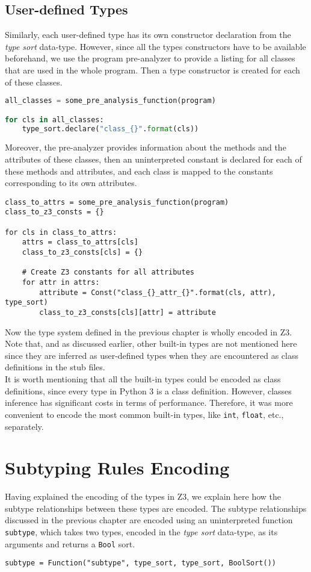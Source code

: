 \subsection{User-defined Types}
Similarly, each user-defined type has its own constructor declaration from the \textit{type sort} data-type. However, since all the types constructors have to be available beforehand, we use the program pre-analyzer to provide a listing for all classes that are used in the whole program. Then a type constructor is created for each of these classes. 

\begin{lstlisting}[language=python]
all_classes = some_pre_analysis_function(program)

for cls in all_classes:
	type_sort.declare("class_{}".format(cls))
\end{lstlisting}

Moreover, the pre-analyzer provides information about the methods and the attributes of these classes, then an uninterpreted constant is declared for each of these methods and attributes, and each class is mapped to the constants corresponding to its own attributes.

\begin{lstlisting}
class_to_attrs = some_pre_analysis_function(program)
class_to_z3_consts = {}

for cls in class_to_attrs:
    attrs = class_to_attrs[cls]
    class_to_z3_consts[cls] = {}
    
    # Create Z3 constants for all attributes
    for attr in attrs:
	    attribute = Const("class_{}_attr_{}".format(cls, attr), type_sort)
	    class_to_z3_consts[cls][attr] = attribute
\end{lstlisting}

Now the type system defined in the previous chapter is wholly encoded in Z3. Note that, and as discussed earlier, other built-in types are not mentioned here since they are inferred as user-defined types when they are encountered as class definitions in the stub files.\\

It is worth mentioning that all the built-in types could be encoded as class definitions, since every type in Python 3 is a class definition. However, classes inference has significant costs in terms of performance. Therefore, it was more convenient to encode the most common built-in types, like \lstinline|int|, \lstinline|float|, etc., separately.

\section{Subtyping Rules Encoding}
Having explained the encoding of the types in Z3, we explain here how the subtype relationships between these types are encoded. The subtype relationships discussed in the previous chapter are encoded using an uninterpreted function \lstinline|subtype|, which takes two types, encoded in the \textit{type sort} data-type, as its arguments and returns a \lstinline|Bool| sort.
\begin{lstlisting}
subtype = Function("subtype", type_sort, type_sort, BoolSort())
\end{lstlisting}

